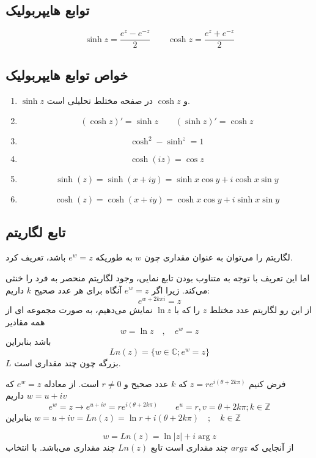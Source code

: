 \documentclass[12pt]{report}
\begin{document}
  	 	  \subsection{توابع هایپربولیک}
  	 	  $$\sinh z = \frac{e^z - e^{-z}}{2} \qquad \cosh z = \frac{e^z + e^{-z}}{2}$$
  	 	  \subsection{خواص توابع هایپربولیک}
  	 	  \begin{enumerate}
  	 	  	\item 
  	 	  	$\sinh z$
  	 	  	و
  	 	  	$\cosh z$
  	 	  	در صفحه مختلط تحلیلی است.
  	 	  	\item
  	 	  	$$(\cosh z)' = \sinh z \qquad (\sinh z)' = \cosh z$$
  	 	  	\item
  	 	  	$$\cosh^2 - \sinh^ z = 1$$
  	 	  	\item
  	 	  	$$\cosh(iz) = \cos z$$
  	 	  	\item
  	 	  	$$\sinh(z) = \sinh(x + iy) =\sinh x \cos y+i \cosh x \sin y$$
  	 	  	\item
  	 	  	$$\cosh(z) = \cosh(x + iy) =\cosh x \cos y+i \sinh x \sin y$$
  	 	  \end{enumerate}
		\subsection{تابع لگاریتم}
		لگاریتم را می‌توان به عنوان مقداری چون 
	$w$
	به طوریکه 	
	$e^w = z$
	باشد، تعریف کرد.
	
	اما این تعریف با توجه به متناوب بودن تابع نمایی، وجود لگاریتم منحصر به فرد را خنثی می‌کند. زیرا اگر
	$e^w = z$
	آنگاه برای هر عدد صحیح 
	$k$
	داریم:
	$$e^{w + 2k \pi i} = z$$
	از این رو لگاریتم عدد مختلط 
	$z$
	را که با 
	$\ln z$
	 نمایش می‌دهیم، به صورت مجموعه ای از همه مقادیر 
	 $$w = \ln z \quad , \quad e^w = z$$
	 باشد بنابراین 
	 $$Ln (z) = \{w \in \mathbb{C} ; e^w = z\}$$
	 $L$
	 بزرگه چون چند مقداری است.
	 
	 فرض کنیم 
	 $z = re^{i(\theta + 2k \pi)}$
	 که 
	 $k$
	 عدد صحیح و 
	 $r \neq 0$
	 است. از معادله 
	 $e^w = z$
	 که 
	 $w = u + iv$
	 داریم 
	 $$e^w = z \rightarrow e^{u + iv} = re^{i(\theta + 2k \pi)} \qquad e^u = r , v = \theta + 2k \pi ;k \in \mathbb{Z}$$
	 بنابراین
	 $w = u + iv = Ln (z) = \ln r + i(\theta + 2k\pi)\quad ;\quad k \in \mathbb{Z}$
	 
	 $$w = Ln (z) = \ln |z| + i \arg z$$
	 از آنجایی که 
	 $arg z$
	 چند مقداری است تابع
	 $Ln(z)$
	 چند مقداری می‌باشد. با انتخاب 
	 
\end{document}
